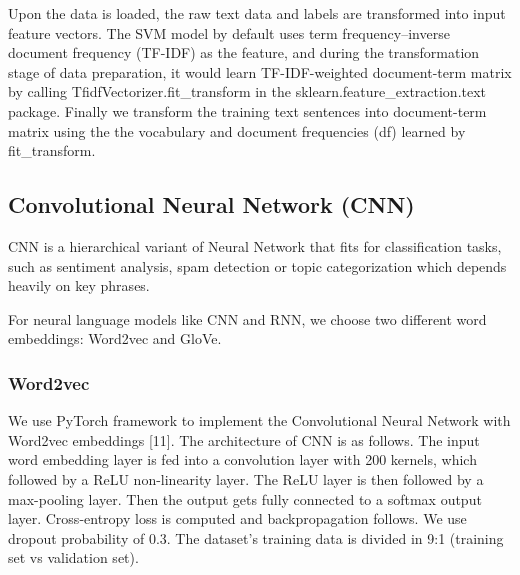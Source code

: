 \documentclass{article}
\begin{document}
 Upon the data is loaded, the raw text data and labels are transformed into input feature vectors. The SVM model by default uses term frequency–inverse document frequency (TF-IDF) as the feature, and during the transformation stage of data preparation, it would learn TF-IDF-weighted document-term matrix by calling TfidfVectorizer.fit\_transform in the sklearn.feature\_extraction.text package. Finally we transform the training text sentences into document-term matrix using the the vocabulary and document frequencies (df) learned by fit\_transform.


\subsection{Convolutional Neural Network (CNN)}
CNN is a hierarchical variant of Neural Network that fits for classification tasks, such as sentiment analysis, spam detection or topic categorization which depends heavily on key phrases.

For neural language models like CNN and RNN, we choose two different word embeddings: Word2vec and GloVe.

\subsubsection{Word2vec}
We use PyTorch framework to implement the Convolutional Neural Network with Word2vec embeddings [11]. The architecture of CNN is as follows. The input word embedding layer is fed into a convolution layer with 200 kernels, which followed by a ReLU non-linearity layer. The ReLU layer is then followed by a max-pooling layer. Then the output gets fully connected to a softmax output layer. Cross-entropy loss is computed and backpropagation follows. We use dropout probability of 0.3. The dataset's training data is divided in 9:1 (training set vs validation set).
\end{document}
